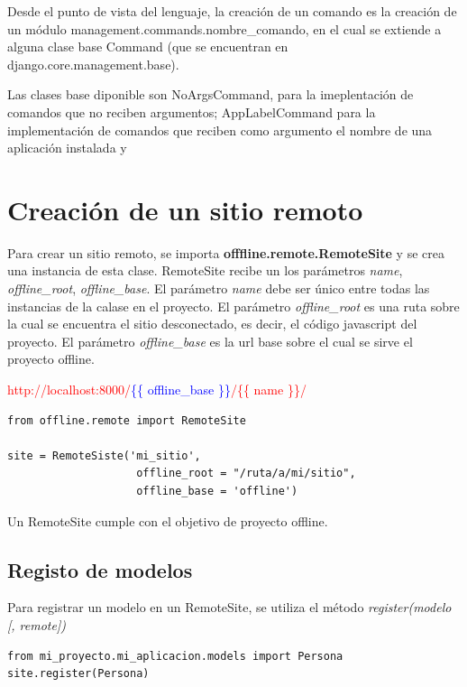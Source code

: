 \documentclass[a4paper]{report}
\begin{document}
Desde el punto de vista del lenguaje, la creación de un comando es la creación
de un módulo management.commands.nombre\_comando, en el cual se extiende 
a alguna clase base Command (que se encuentran en django.core.management.base).

Las clases base diponible son NoArgsCommand, para la imeplentación de comandos
que no reciben argumentos; AppLabelCommand para la implementación de comandos
que reciben como argumento el nombre de una aplicación instalada y 

\section{Creación de un sitio remoto}
Para crear un sitio remoto, se importa \textbf{offfline.remote.RemoteSite} y se
crea una instancia de esta clase. RemoteSite recibe un los parámetros
\textit{name}, \textit{offline\_root}, \textit{offline\_base}.
El parámetro \textit{name} debe ser único entre todas las instancias de la
calase en el proyecto.
El parámetro \textit{offline\_root} es una ruta sobre la cual se encuentra
el sitio desconectado, es decir, el código javascript del proyecto.
El parámetro \textit{offline\_base} es la url base sobre el cual se sirve el
proyecto offline.

\textcolor{red}{http://localhost:8000/\textcolor{blue}{\{\{ offline\_base
\}\}}/\textcolor{WildStrawberry}{\{\{ name \}\}}/}


\begin{lstlisting}[style=python,
					caption=Configuración básica de un sitio remoto]
from offline.remote import RemoteSite

site = RemoteSiste('mi_sitio', 
                    offline_root = "/ruta/a/mi/sitio", 
                    offline_base = 'offline')

\end{lstlisting}

Un RemoteSite cumple con el objetivo de proyecto offline.

\subsection{Registo de modelos}
Para registrar un modelo en un RemoteSite, se utiliza el método
\textit{register(modelo [, remote])}
\begin{lstlisting}[style=python,
					caption=Registro de un RemoteSite]
from mi_proyecto.mi_aplicacion.models import Persona
site.register(Persona)
\end{lstlisting}
\end{document}
